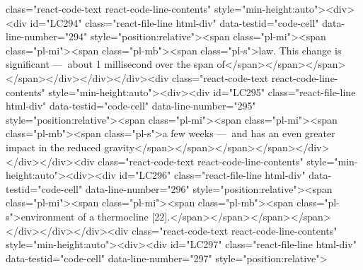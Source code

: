 {{{{class="react-code-text react-code-line-contents" style="min-height:auto"><div><div id="LC294" class="react-file-line html-div" data-testid="code-cell" data-line-number="294" style="position:relative"><span class="pl-mi"><span class="pl-mi"><span class="pl-mb"><span class="pl-s">law. This change is significant ---~about 1 millisecond over the span of</span></span></span></span></div></div></div><div class="react-code-text react-code-line-contents" style="min-height:auto"><div><div id="LC295" class="react-file-line html-div" data-testid="code-cell" data-line-number="295" style="position:relative"><span class="pl-mi"><span class="pl-mi"><span class="pl-mb"><span class="pl-s">a few weeks ---~and has an even greater impact in the reduced gravity</span></span></span></span></div></div></div><div class="react-code-text react-code-line-contents" style="min-height:auto"><div><div id="LC296" class="react-file-line html-div" data-testid="code-cell" data-line-number="296" style="position:relative"><span class="pl-mi"><span class="pl-mi"><span class="pl-mb"><span class="pl-s">environment of a thermocline {[}22{]}.</span></span></span></span></div></div></div><div class="react-code-text react-code-line-contents" style="min-height:auto"><div><div id="LC297" class="react-file-line html-div" data-testid="code-cell" data-line-number="297" style="position:relative">
}}}}
